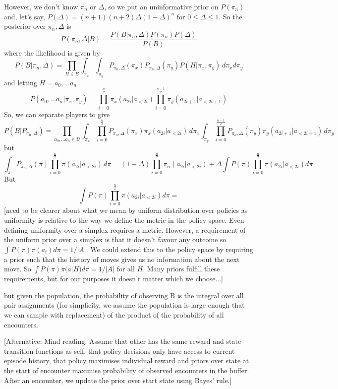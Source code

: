 \documentclass[a4paper]{report}
\begin{document}
However, we don't know $\pi_n$ or $\Delta$, so we put an uninformative prior on $P(\pi_n)$ and, let's say, $P(\Delta) = (n+1)(n+2)\Delta(1-\Delta)^n$ for $0 \le \Delta \le 1$. So the posterior over $\pi_n, \Delta$ is
\[
P(\pi_n,\Delta|B) = \frac{P(B|\pi_n,\Delta)P(\pi_n)P(\Delta)}{P(B)}
\]
where the likelihood is given by
\[
P(B|\pi_n,\Delta) = \prod_{H\in B} \int_{\pi_x}  \int_{\pi_y} P_{\pi_n,\Delta}(\pi_x) P_{\pi_n,\Delta}(\pi_y) P(H|\pi_x,\pi_y)
\, d\pi_x d\pi_y
\]
and letting $H=a_0,...a_n$
\[
P(a_0,...a_n|\pi_x,\pi_y) = \prod_{i=0}^{\frac{n}{2}} \pi_x(a_{2i}|a_{<2i}) \prod_{i=0}^{\frac{n-1}{2}} \pi_y(a_{2i+1}|a_{<2i+1})
\]
So, we can separate players to give
\[
P(B|P_{\pi_n,\Delta}) = \prod_{a_0,...a_n\in B}
\int_{\pi_x} \prod_{i=0}^{\frac{n}{2}} P_{\pi_n,\Delta}(\pi_x)  \pi_x(a_{2i}|a_{<2i})\, d\pi_x
\int_{\pi_y} \prod_{i=0}^{\frac{n-1}{2}} P_{\pi_n,\Delta}(\pi_y)  \pi_y(a_{2i+1}|a_{<2i+1}) \,  d\pi_y
\]
but
\[
\int_\pi P_{\pi_n,\Delta}(\pi)  \prod_{i=0}^{\frac{n}{2}} \pi(a_{2i}|a_{<2i})\, d\pi = (1-\Delta) \prod_{i=0}^{\frac{n}{2}} \pi_n(a_{2i}|a_{<2i}) + \Delta \int P(\pi) \prod_{i=0}^{\frac{n}{2}} \pi(a_{2i}|a_{<2i}) d\pi
\]
But
\[
\int P(\pi) \prod_{i=0}^{\frac{n}{2}} \pi(a_{2i}|a_{<2i}) d\pi = 
\]
[need to be clearer about what we mean by uniform distribution over policies as uniformity is relative to the way we define the metric in the policy space. Even defining uniformity over a simplex requires a metric. However, a requirement of the uniform prior over a simplex is that it doesn't favour any outcome so $\int P(\pi)\pi(a_i) d\pi = 1/|A|$. We could extend this to the policy space by requiring a prior such that the history of moves gives us no information about the next move. So $\int P(\pi)\pi(a|H) d\pi = 1/|A|$ for all $H$. Many priors fulfill these requirements, but for our purposes it doesn't matter which we choose...]

but given the population, the probability of observing B is the integral over all pair assignments (for simplicity, we assume the population is large enough that we can sample with replacement) of the product of the probability of all encounters.



[Alternative: Mind reading. Assume that other has the same reward and state transition functions as self, that policy decisions only have access to current episode history, that policy maximises individual reward and priors over state at the start of encounter maximise probability of observed encounters in the buffer. After an encounter, we update the prior over start state using Bayes' rule.]
\end{document}
